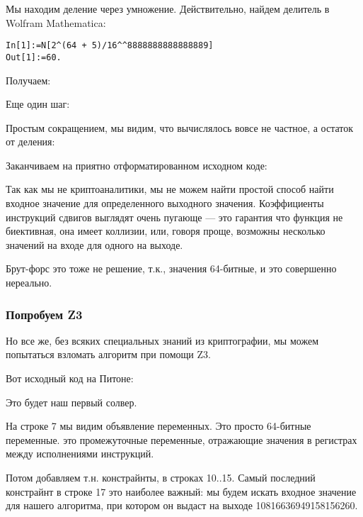 Мы находим деление через умножение.
Действительно, найдем делитель в Wolfram Mathematica:

\begin{lstlisting}[caption=Wolfram Mathematica]
In[1]:=N[2^(64 + 5)/16^^8888888888888889]
Out[1]:=60.
\end{lstlisting}

Получаем:



Еще один шаг:



Простым сокращением, мы видим, что вычислялось вовсе не частное, а остаток от деления:



Заканчиваем на приятно отформатированном исходном коде:



Так как мы не криптоаналитики, мы не можем найти простой способ найти входное значение
для определенного выходного значения.
Коэффициенты инструкций сдвигов выглядят очень пугающе --- это гарантия что функция не биективная,
она имеет коллизии, или, говоря проще, возможны несколько значений на входе для одного на выходе.

Брут-форс это тоже не решение, т.к., значения 64-битные, и это совершенно нереально.

\subsubsection{Попробуем Z3}

Но все же, без всяких специальных знаний из криптографии, мы можем попытаться взломать алгоритм при помощи Z3.

Вот исходный код на Питоне:



Это будет наш первый солвер.

На строке 7 мы видим объявление переменных.
Это просто 64-битные переменные.
 это промежуточные переменные, отражающие значения в регистрах между исполнениями инструкций.

Потом добавляем т.н. констрайнты, в строках 10..15.
Самый последний констрайнт в строке 17 это наиболее важный: мы будем искать входное значение для
нашего алгоритма, при котором он выдаст на выходе 10816636949158156260.

